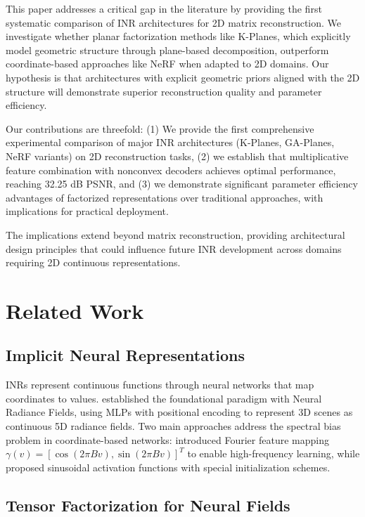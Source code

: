 \documentclass{article}
\begin{document}
This paper addresses a critical gap in the literature by providing the first systematic comparison of INR architectures for 2D matrix reconstruction. We investigate whether planar factorization methods like K-Planes, which explicitly model geometric structure through plane-based decomposition, outperform coordinate-based approaches like NeRF when adapted to 2D domains. Our hypothesis is that architectures with explicit geometric priors aligned with the 2D structure will demonstrate superior reconstruction quality and parameter efficiency.

Our contributions are threefold: (1) We provide the first comprehensive experimental comparison of major INR architectures (K-Planes, GA-Planes, NeRF variants) on 2D reconstruction tasks, (2) we establish that multiplicative feature combination with nonconvex decoders achieves optimal performance, reaching 32.25 dB PSNR, and (3) we demonstrate significant parameter efficiency advantages of factorized representations over traditional approaches, with implications for practical deployment.

The implications extend beyond matrix reconstruction, providing architectural design principles that could influence future INR development across domains requiring 2D continuous representations.

\section{Related Work}

\subsection{Implicit Neural Representations}

INRs represent continuous functions through neural networks that map coordinates to values. \citet{mildenhall2020nerf} established the foundational paradigm with Neural Radiance Fields, using MLPs with positional encoding to represent 3D scenes as continuous 5D radiance fields. Two main approaches address the spectral bias problem in coordinate-based networks: \citet{tancik2020fourier} introduced Fourier feature mapping $\gamma(v) = [\cos(2\pi Bv), \sin(2\pi Bv)]^T$ to enable high-frequency learning, while \citet{sitzmann2020siren} proposed sinusoidal activation functions with special initialization schemes.

\subsection{Tensor Factorization for Neural Fields}
\end{document}
